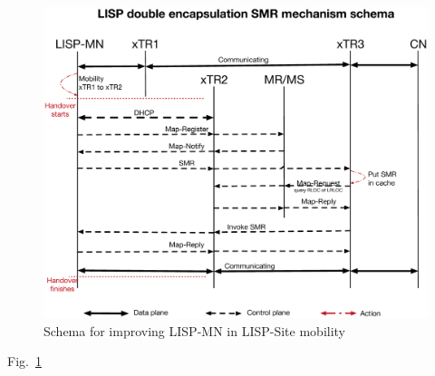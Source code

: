 \begin{figure}[!th]
	\centering
	\includegraphics[width=\textwidth]{Pics/Mobility_LISPMN_xTR_schema_SMR_improving_simplify}
	\caption{Schema for improving LISP-MN in LISP-Site mobility}
	\label{sim_schema_LISPMN_xTR_improving}
\end{figure}
Fig.~\ref{sim_schema_LISPMN_xTR_improving}

